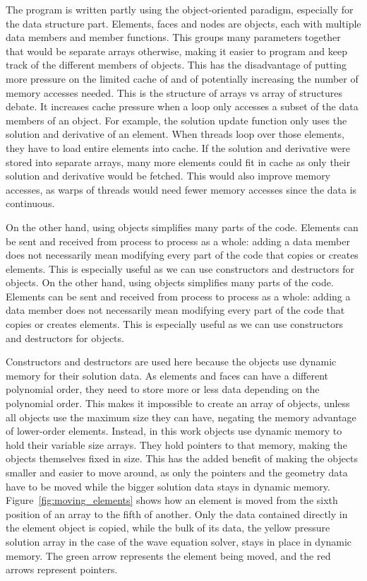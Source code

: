 The program is written partly using the object-oriented paradigm, especially for the data structure
part. Elements, faces and nodes are objects, each with multiple data members and member functions.
This groups many parameters together that would be separate arrays otherwise, making it easier to
program and keep track of the different members of objects. This has the disadvantage of putting
more pressure on the limited cache of  and of potentially increasing the number
of memory accesses needed. This is the structure of arrays vs array of structures debate. It
increases cache pressure when a loop only accesses a subset of the data members of an object. For
example, the solution update function only uses the solution and derivative of an element. When
threads loop over those elements, they have to load entire elements into cache. If the solution and
derivative were stored into separate arrays, many more elements could fit in cache as only their
solution and derivative would be fetched. This would also improve memory accesses, as warps of
threads would need fewer memory accesses since the data is continuous.

On the other hand, using objects simplifies many parts of the code. Elements can be sent and
received from process to process as a whole: adding a data member does not necessarily mean
modifying every part of the code that copies or creates elements. This is especially useful as we
can use constructors and destructors for objects.
On the other hand, using objects simplifies many parts of the code. Elements can be sent and
received from process to process as a whole: adding a data member does not necessarily mean
modifying every part of the code that copies or creates elements. This is especially useful as we
can use constructors and destructors for objects.

Constructors and destructors are used here because the objects use dynamic memory for their solution
data. As elements and faces can have a different polynomial order, they need to store more or less
data depending on the polynomial order. This makes it impossible to create an array of objects,
unless all objects use the maximum size they can have, negating the memory advantage of lower-order
elements. Instead, in this work objects use dynamic memory to hold their variable size arrays. They
hold pointers to that memory, making the objects themselves fixed in size. This has the added
benefit of making the objects smaller and easier to move around, as only the pointers and the
geometry data have to be moved while the bigger solution data stays in dynamic memory.
Figure~\ref{fig:moving_elements} shows how an element is moved from the sixth position of an array
to the fifth of another. Only the data contained directly in the element object is copied, while the
bulk of its data, the yellow pressure solution array in the case of the wave equation solver, stays
in place in dynamic memory. The green arrow represents the element being moved, and the red arrows
represent pointers.

